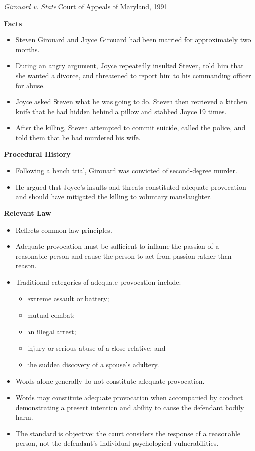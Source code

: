 \documentclass[11pt]{tex/lawoutline}
\begin{document}
\casebox
    {\textit{Girouard v. State}}
    {Court of Appeals of Maryland, 1991}
    {
        \textbf{Facts}
        \begin{itemize}
            \item Steven Girouard and Joyce Girouard had been married for approximately two months.
            \item During an angry argument, Joyce repeatedly insulted Steven, told him that she wanted a divorce, and threatened to report him to his commanding officer for abuse.
            \item Joyce asked Steven what he was going to do. Steven then retrieved a kitchen knife that he had hidden behind a pillow and stabbed Joyce 19 times.
            \item After the killing, Steven attempted to commit suicide, called the police, and told them that he had murdered his wife.
        \end{itemize}

        \textbf{Procedural History}
        \begin{itemize}
            \item Following a bench trial, Girouard was convicted of second-degree murder.
            \item He argued that Joyce's insults and threats constituted adequate provocation and should have mitigated the killing to voluntary manslaughter.
        \end{itemize}

        \textbf{Relevant Law}
        \begin{itemize}
            \item Reflects common law principles.
            \item Adequate provocation must be sufficient to inflame the passion of a reasonable person and cause the person to act from passion rather than reason.
            \item Traditional categories of adequate provocation include:
            \begin{itemize}
                \item extreme assault or battery;
                \item mutual combat;
                \item an illegal arrest;
                \item injury or serious abuse of a close relative; and
                \item the sudden discovery of a spouse's adultery.
            \end{itemize}
            \item Words alone generally do not constitute adequate provocation.
            \item Words may constitute adequate provocation when accompanied by conduct demonstrating a present intention and ability to cause the defendant bodily harm.
            \item The standard is objective: the court considers the response of a reasonable person, not the defendant's individual psychological vulnerabilities.
        \end{itemize}

}
\end{document}
